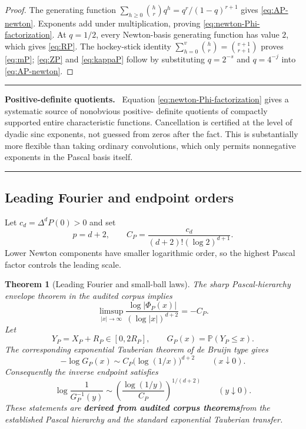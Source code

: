 \documentclass[11pt,oneside]{article}
\numberwithin{equation}{section}
\newtheorem{theorem}{Theorem}[section]
\theoremstyle{definition}
\theoremstyle{remark}
\newcommand{\Prob}{\mathbb P}
\newcommand{\statusderived}{\textcolor{linkblue}{\textbf{derived from audited corpus theorems}}}
\newenvironment{resultbox}[1]{%
  \par\medskip\noindent\begin{center}\begin{minipage}{0.94\textwidth}%
  \color{deepgreen}\hrule\vspace{0.65em}%
  \color{black}\textbf{\color{deepgreen}#1.}\ }{%
  \par\vspace{0.65em}\color{deepgreen}\hrule
  \end{minipage}\end{center}\medskip}
\begin{document}
\begin{proof}
The generating function
$\sum_{h\ge0}\binom hrq^h=q^r/(1-q)^{r+1}$ gives
\eqref{eq:AP-newton}.  Exponents add under multiplication, proving
\eqref{eq:newton-Phi-factorization}.  At $q=1/2$, every Newton-basis generating function
has value $2$, which gives \eqref{eq:RP}.  The hockey-stick identity
$\sum_{h=0}^{v}\binom hr=\binom{v+1}{r+1}$ proves \eqref{eq:mP};
\eqref{eq:ZP} and \eqref{eq:kappaP} follow by substituting $q=2^{-s}$ and $q=4^{-j}$
into \eqref{eq:AP-newton}.
\end{proof}

\begin{resultbox}{Positive-definite quotients}
Equation \eqref{eq:newton-Phi-factorization} gives a systematic source of nonobvious positive-
definite quotients of compactly supported entire characteristic functions.  Cancellation is
certified at the level of dyadic sinc exponents, not guessed from zeros after the fact.  This
is substantially more flexible than taking ordinary convolutions, which only permits
nonnegative exponents in the Pascal basis itself.
\end{resultbox}

\subsection{Leading Fourier and endpoint orders}

Let $c_d=\Delta^dP(0)>0$ and set
\begin{equation}
 p=d+2,
 \qquad
 C_P=\frac{c_d}{(d+2)!(\log2)^{d+1}}.
 \label{eq:CP}
\end{equation}
Lower Newton components have smaller logarithmic order, so the highest Pascal factor controls
the leading scale.

\begin{theorem}[Leading Fourier and small-ball laws]
\label{thm:leading-laws}
The sharp Pascal-hierarchy envelope theorem in the audited corpus implies
\begin{equation}
 \limsup_{|x|\to\infty}
 \frac{\log|\Phi_P(x)|}{(\log|x|)^{d+2}}
 =-C_P.
 \label{eq:fourier-leading-P}
\end{equation}
Let
\[
 Y_P=X_P+R_P\in[0,2R_P],
 \qquad
 G_P(x)=\Prob(Y_P\le x).
\]
The corresponding exponential Tauberian theorem of de Bruijn type
\cite{debruijn1959,voss2009} gives
\begin{equation}
 -\log G_P(x)
 \sim C_P\bigl(\log(1/x)\bigr)^{d+2}
 \qquad(x\downarrow0).
 \label{eq:smallball-leading-P}
\end{equation}
Consequently the inverse endpoint satisfies
\begin{equation}
 \boxed{
 \log\frac1{G_P^{-1}(y)}
 \sim
 \left(\frac{\log(1/y)}{C_P}\right)^{1/(d+2)}
 \qquad(y\downarrow0).}
 \label{eq:inverse-leading-P}
\end{equation}
These statements are \statusderived from the established Pascal hierarchy and the standard
exponential Tauberian transfer.
\end{theorem}
\end{document}
